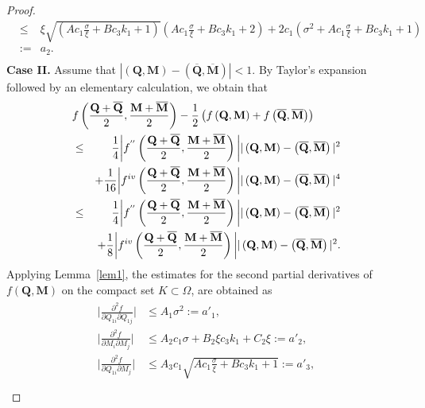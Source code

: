\documentclass{article}
\def\Qvec{\mathbf{Q}}
\def \Mvec{\mathbf{M}}
\begin{document}
\begin{proof}
\begin{eqnarray}
&\le&\xi\sqrt{\left(A c_1 \frac{\sigma}{\xi} + Bc_3k_1 + 1\right)}\left(A c_1 \frac{\sigma}{\xi} + Bc_3k_1 + 2\right)+2c_1\left(\sigma^2+ A c_1 \frac{\sigma}{\xi} + Bc_3k_1  + 1\right)\nonumber\\
&:=&a_2.\nonumber\\
\label{eq:first_de2}
\end{eqnarray}
\textbf{Case II.} Assume that $|\left(\Qvec, \Mvec\right)-\left(\overline{\Qvec}, \overline{\Mvec}\right)| < 1$.\newline
By Taylor's expansion followed by an elementary calculation, we obtain that
\begin{eqnarray}\label{eq:un2'}
\lefteqn{
f\left(\frac{\Qvec+\overline{\Qvec}}{2}, \frac{\Mvec+\overline{\Mvec}}{2}\right)-\frac{1}{2}\left(f\left(\Qvec, \Mvec\right) + f\left(\overline{\Qvec}, \overline{\Mvec}\right)\right)}\nonumber\\
&\le& \frac{1}{4}\bigg|f^{''}\left(\frac{\Qvec+\overline{\Qvec}}{2}, \frac{\Mvec+\overline{\Mvec}}{2}\right)\bigg||\left(\Qvec, \Mvec\right)-\left(\overline{\Qvec}, \overline{\Mvec}\right)|^2 \nonumber\\
&&+\frac{1}{16}\bigg|f^{iv}\left(\frac{\Qvec+\overline{\Qvec}}{2}, \frac{\Mvec+\overline{\Mvec}}{2}\right)\bigg||\left(\Qvec, \Mvec\right)-\left(\overline{\Qvec}, \overline{\Mvec}\right)|^4\nonumber\\
&\le& \frac{1}{4}\bigg|f^{''}\left(\frac{\Qvec+\overline{\Qvec}}{2}, \frac{\Mvec+\overline{\Mvec}}{2}\right)\bigg||\left(\Qvec, \Mvec\right)-\left(\overline{\Qvec}, \overline{\Mvec}\right)|^2 \nonumber\\ && +\frac{1}{8}\bigg|f^{iv}\left(\frac{\Qvec+\overline{\Qvec}}{2}, \frac{\Mvec+\overline{\Mvec}}{2}\right)\bigg||\left(\Qvec, \Mvec\right)-\left(\overline{\Qvec}, \overline{\Mvec}\right)|^2.\nonumber\\
\end{eqnarray}
Applying Lemma~\ref{lem1}, the estimates for the second partial derivatives of $f\left(\Qvec, \Mvec\right)$ on the compact set $K\subset\Omega$, are obtained as 
\begin{eqnarray}
\begin{aligned}
\bigg|\frac{\partial^2 f}{\partial Q_{1i}\partial Q_{1j}}\bigg|&\le A_1\sigma^2:=a'_1,\\
\biggl|\frac{\partial^2 f}{\partial M_{i}\partial M_{j}}\biggr|&\le A_2c_1\sigma+B_2\xi c_3k_1+C_2\xi:=a'_2,\\
\biggl|\frac{\partial^2 f}{\partial Q_{1i}\partial M_{j}}\biggr|&\le A_3c_1\sqrt{Ac_1\frac{\sigma}{\xi}+Bc_3k_1+1 }:=a'_3,\\

\end{aligned}
\end{eqnarray}
\end{proof}
\end{document}
